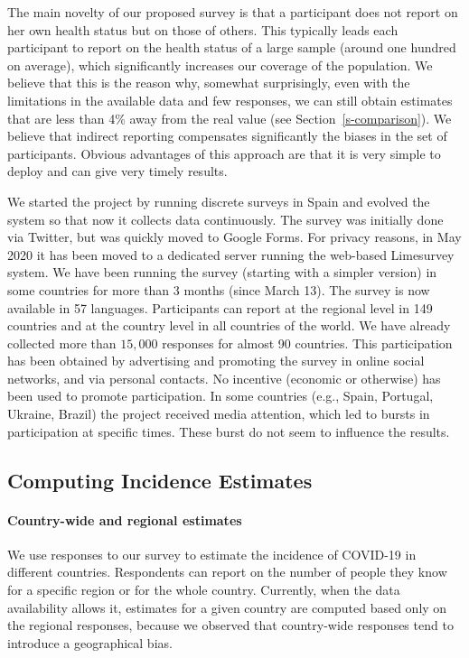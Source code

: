 \documentclass[sigconf]{acmart}
\newcommand{\af}[1]{{#1}}
\begin{document}
The main novelty of our proposed survey is that a participant does not report on her own health status but on those of others. This typically leads each participant to report on the health status of a large sample (around one hundred on average), which significantly increases our coverage of the population. We believe that this is the reason why, 
somewhat surprisingly, even with the limitations in the available data and few responses, we can still obtain estimates that are less than 4\% away from the real value (see Section~\ref{s-comparison}). 
\af{We believe that indirect reporting compensates significantly the biases in the set of participants.}
Obvious advantages of this approach are that it is very simple to deploy and can give very timely results.

We started the project by running discrete surveys in Spain and evolved the system so that now it collects data continuously.
\af{The survey was initially done via Twitter, but was quickly moved to Google Forms. For privacy reasons, in May 2020 it has been moved to a
dedicated server running the web-based Limesurvey system.}
We have been running the survey (starting with a simpler version) in some countries for more than 3 months (since March 13). The survey is now available in 57 languages. Participants can report at the regional level in 149 countries and at the country level in all countries of the world. We have already collected more than $15,000$ responses for almost 90 countries. \af{This participation has been obtained by advertising and promoting
the survey in online social networks, and via personal contacts. No incentive (economic or otherwise) has been used to promote participation. In some countries (e.g., Spain, Portugal, Ukraine, Brazil) the project received media attention, which led to bursts in participation at specific times. These burst do not seem to influence the results.}

\subsection{Computing Incidence Estimates}

\paragraph{Country-wide and regional estimates} 
We use responses to our survey to estimate the incidence of COVID-19 in different countries. Respondents can report on the number of people they know for a specific region or for the whole country. 
Currently, when the data availability allows it,  estimates for a given country are computed based only on the regional responses, because \af{we observed that} country-wide responses tend to introduce a geographical bias. 
\end{document}
